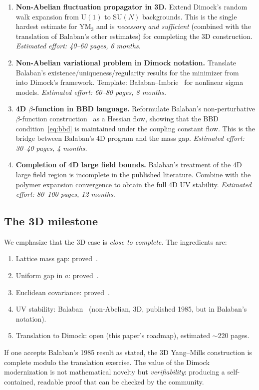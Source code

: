 \documentclass[11pt,a4paper]{article}
\theoremstyle{plain}
\theoremstyle{definition}
\theoremstyle{remark}
\newcommand{\SU}{\mathrm{SU}}
\newcommand{\U}{\mathrm{U}}
\begin{document}
\begin{enumerate}[label=\textbf{P\arabic*.}]
  \item \textbf{Non-Abelian fluctuation propagator
    in 3D.} Extend Dimock's random walk expansion
    from $\U(1)$ to $\SU(N)$ backgrounds. This is the
    single hardest estimate for YM$_3$ and is
    \emph{necessary and sufficient} (combined with
    the translation of Balaban's other estimates) for
    completing the 3D construction.
    \emph{Estimated effort: 40--60 pages, 6 months.}

  \item \textbf{Non-Abelian variational problem
    in Dimock notation.} Translate Balaban's
    existence/uniqueness/regularity results
    for the minimizer from~\cite{Bal85d} into
    Dimock's framework. Template:
    Bałaban--Imbrie~\cite{BI_sigma} for nonlinear
    sigma models.
    \emph{Estimated effort: 60--80 pages, 8 months.}

  \item \textbf{4D $\beta$-function in BBD language.}
    Reformulate Balaban's non-perturbative
    $\beta$-function construction~\cite{Bal87,Bal88a}
    as a Hessian flow, showing that the BBD
    condition~\eqref{eq:bbd} is maintained under the
    coupling constant flow. This is the bridge
    between Balaban's 4D program and the mass gap.
    \emph{Estimated effort: 30--40 pages, 4 months.}

  \item \textbf{Completion of 4D large field bounds.}
    Balaban's treatment of the 4D large field
    region is incomplete in the published
    literature. Combine with the polymer expansion
    convergence to obtain the full 4D UV stability.
    \emph{Estimated effort: 80--100 pages, 12 months.}
\end{enumerate}

\subsection{The 3D milestone}

We emphasize that the 3D case is \emph{close to
complete}. The ingredients are:
\begin{enumerate}[label=(\roman*),nosep]
  \item Lattice mass gap: proved~\cite{FontesGap}.
  \item Uniform gap in $a$: proved~\cite{FontesUniform}.
  \item Euclidean covariance: proved~\cite{FontesEuclidean}.
  \item UV stability: Balaban~\cite{Bal85e} (non-Abelian,
    3D, published 1985, but in Balaban's notation).
  \item Translation to Dimock: open (this paper's
    roadmap), estimated $\sim$220 pages.
\end{enumerate}
If one accepts Balaban's 1985 result as stated,
the 3D Yang--Mills construction is complete modulo
the translation exercise. The value of the Dimock
modernization is not mathematical novelty but
\emph{verifiability}: producing a self-contained,
readable proof that can be checked by the community.
\end{document}
